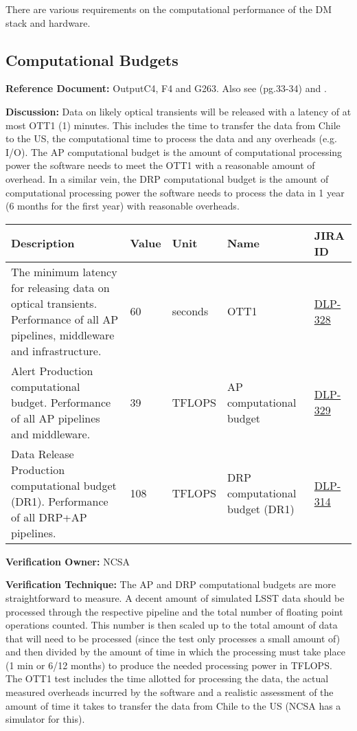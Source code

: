 \documentclass[DM,lsstdraft,toc]{lsstdoc}
\newcommand{\jira}[1]{\href{https://jira.lsstcorp.org/browse/#1}{#1}}
\begin{document}
There are various requirements on the computational performance of the
DM stack and hardware.

\subsection{Computational Budgets}\label{computational-budgets}

\textbf{Reference Document:} \textbar{}Output\textbar{}C4, F4 and
\textbar{}G263. Also see \SRD (pg.33-34) and .

\textbf{Discussion:} Data on likely optical transients will be released
with a latency of at most OTT1 (1) minutes. This includes the time to
transfer the data from Chile to the US, the computational time to
process the data and any overheads (e.g. I/O). The AP computational
budget is the amount of computational processing power the software
needs to meet the OTT1 with a reasonable amount of overhead. In a
similar vein, the DRP computational budget is the amount of
computational processing power the software needs to process the data in
1 year (6 months for the first year) with reasonable overheads.

\begin{longtable}[]{@{}p{}llp{1.5in}l@{}}
\toprule
Description & Value & Unit & Name & JIRA ID\tabularnewline
\midrule
\endhead
The minimum latency for releasing data on optical transients.
Performance of all AP pipelines, middleware and infrastructure. & 60 &
seconds & OTT1 & \jira{DLP-328}\tabularnewline
Alert Production computational budget. Performance of all AP pipelines
and middleware. & 39 & TFLOPS & AP computational budget &
\jira{DLP-329}\tabularnewline
Data Release Production computational budget (DR1). Performance of all
DRP+AP pipelines. & 108 & TFLOPS & DRP computational budget (DR1) &
\jira{DLP-314}\tabularnewline
\bottomrule
\end{longtable}

\textbf{Verification Owner:} NCSA

\textbf{Verification Technique:} The AP and DRP computational budgets
are more straightforward to measure. A decent amount of simulated LSST
data should be processed through the respective pipeline and the total
number of floating point operations counted. This number is then scaled
up to the total amount of data that will need to be processed (since the
test only processes a small amount of) and then divided by the amount of
time in which the processing must take place (1 min or 6/12 months) to
produce the needed processing power in TFLOPS. The OTT1 test includes
the time allotted for processing the data, the actual measured overheads
incurred by the software and a realistic assessment of the amount of
time it takes to transfer the data from Chile to the US (NCSA has a
simulator for this).
\end{document}
